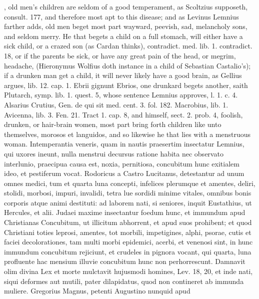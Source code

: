 {{, old men's children
are seldom of a good temperament, as Scoltzius supposeth, consult. 177,
and therefore most apt to this disease; and as Levinus Lemnius
farther adds, old men beget most part wayward, peevish, sad, melancholy
sons, and seldom merry. He that begets a child on a full stomach, will
either have a sick child, or a crazed son (as Cardan thinks),
contradict. med. lib. 1. contradict. 18, or if the parents be sick, or
have any great pain of the head, or megrim, headache, (Hieronymus
Wolfius doth instance in a child of Sebastian Castalio's); if a
drunken man get a child, it will never likely have a good brain, as
Gellius argues, lib. 12. cap. 1. Ebrii gignunt Ebrios, one drunkard
begets another, saith Plutarch, symp. lib. 1. quest. 5, whose
sentence Lemnius approves, l. 1. c. 4. Alsarius Crutius, Gen. de
qui sit med. cent. 3. fol. 182. Macrobius, lib. 1. Avicenna, lib. 3.
Fen. 21. Tract 1. cap. 8, and \Aristotle himself, sect. 2. prob. 4,
foolish, drunken, or hair-brain women, most part bring forth children
like unto themselves, morosos et languidos, and so likewise he that
lies with a menstruous woman. Intemperantia veneris, quam in nautis
praesertim insectatur  Lemnius, qui uxores ineunt, nulla menstrui
decursus ratione habita nec observato interlunio, praecipua causa est,
noxia, pernitiosa, concubitum hunc exitialem ideo, et pestiferum vocat.
Rodoricus a Castro Lucitanus, detestantur ad unum omnes medici,
tum et quarta luna concepti, infelices plerumque et amentes, deliri,
stolidi, morbosi, impuri, invalidi, tetra lue sordidi minime vitales,
omnibus bonis corporis atque animi destituti: ad laborem nati, si
seniores, inquit Eustathius, ut Hercules, et alii. Judaei maxime
insectantur foedum hunc, et immundum apud Christianas Concubitum, ut
illicitum abhorrent, et apud suos prohibent; et quod Christiani toties
leprosi, amentes, tot morbili, impetigines, alphi, psorae, cutis et
faciei decolorationes, tam multi morbi epidemici, acerbi, et venenosi
sint, in hunc immundum concubitum rejiciunt, et crudeles in pignora
vocant, qui quarta, luna profluente hac mensium illuvie concubitum hunc
non perhorrescunt. Damnavit olim divina Lex et morte mulctavit
hujusmodi homines, Lev. 18, 20, et inde nati, siqui deformes aut
mutili, pater dilapidatus, quod non contineret ab  immunda
muliere. Gregorius Magnus, petenti Augustino nunquid apud
}}
